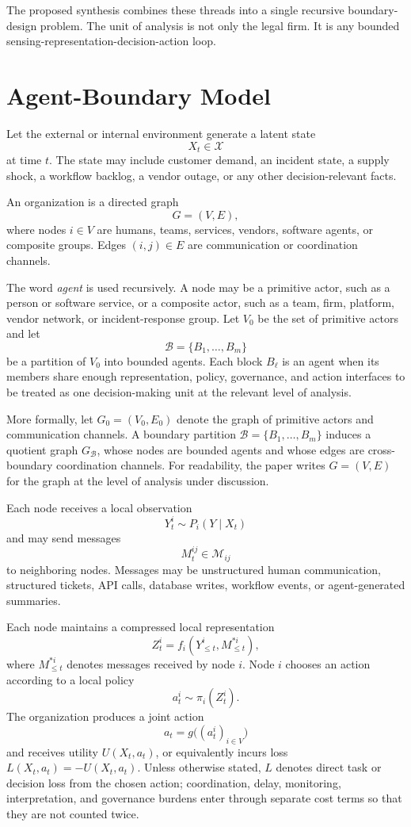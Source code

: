 \documentclass[11pt]{article}
\newcommand{\calB}{\mathcal{B}}
\newcommand{\calX}{\mathcal{X}}
\newcommand{\calM}{\mathcal{M}}
\begin{document}
The proposed synthesis combines these threads into a
single recursive boundary-design problem. The unit of analysis is not only the legal
firm. It is any bounded sensing-representation-decision-action loop.

\section{Agent-Boundary Model}

Let the external or internal environment generate a latent state
\[
X_t \in \calX
\]
at time \(t\). The state may include customer demand, an incident state, a
supply shock, a workflow backlog, a vendor outage, or any other
decision-relevant facts.

An organization is a directed graph
\[
G=(V,E),
\]
where nodes \(i \in V\) are humans, teams, services, vendors, software agents,
or composite groups. Edges \((i,j)\in E\) are communication or coordination
channels.

The word \emph{agent} is used recursively. A node may be a primitive actor,
such as a person or software service, or a composite actor, such as a team,
firm, platform, vendor network, or incident-response group. Let \(V_0\) be the
set of primitive actors and let
\[
\calB=\{B_1,\ldots,B_m\}
\]
be a partition of \(V_0\) into bounded agents. Each block \(B_\ell\) is an
agent when its members share enough representation, policy, governance, and
action interfaces to be treated as one decision-making unit at the relevant
level of analysis.

More formally, let \(G_0=(V_0,E_0)\) denote the graph of primitive actors and
communication channels. A boundary partition
\(\calB=\{B_1,\ldots,B_m\}\) induces a quotient graph \(G_{\calB}\), whose
nodes are bounded agents and whose edges are cross-boundary coordination
channels. For readability, the paper writes \(G=(V,E)\) for the graph at the
level of analysis under discussion.

Each node receives a local observation
\[
Y_t^i \sim P_i(Y\mid X_t)
\]
and may send messages
\[
M_t^{ij}\in\calM_{ij}
\]
to neighboring nodes. Messages may be unstructured human communication,
structured tickets, API calls, database writes, workflow events, or
agent-generated summaries.

Each node maintains a compressed local representation
\[
Z_t^i=f_i(Y_{\leq t}^i,M_{\leq t}^{*i}),
\]
where \(M_{\leq t}^{*i}\) denotes messages received by node \(i\). Node \(i\)
chooses an action according to a local policy
\[
a_t^i \sim \pi_i(Z_t^i).
\]
The organization produces a joint action
\[
a_t=g\big((a_t^i)_{i\in V}\big)
\]
and receives utility \(U(X_t,a_t)\), or equivalently incurs loss
\(L(X_t,a_t)=-U(X_t,a_t)\). Unless otherwise stated, \(L\) denotes direct task or decision
loss from the chosen action; coordination, delay, monitoring, interpretation,
and governance burdens enter through separate cost terms so that they are not
counted twice.
\end{document}
